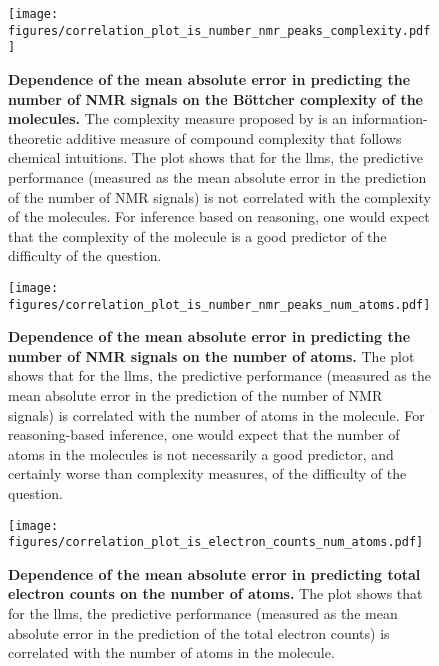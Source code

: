 \begin{figure}
    \centering 
    \texttt{[image: figures/correlation\_plot\_is\_number\_nmr\_peaks\_complexity.pdf]}
    \caption{\textbf{Dependence of the mean absolute error in predicting the number of NMR signals on the Böttcher complexity of the molecules.} The complexity measure proposed by \textcite{B_ttcher_2016} is an information-theoretic additive measure of compound complexity that follows chemical intuitions.
    The plot shows that for the \glspl{llm}, the predictive performance (measured as the mean absolute error in the prediction of the number of NMR signals) is not correlated with the complexity of the molecules. For inference based on reasoning, one would expect that the complexity of the molecule is a good predictor of the difficulty of the question.}
    \label{fig:correlation_plot_is_number_nmr_peaks_complexity}
\end{figure}

\begin{figure}
    \centering
    \texttt{[image: figures/correlation\_plot\_is\_number\_nmr\_peaks\_num\_atoms.pdf]}
    \caption{\textbf{Dependence of the mean absolute error in predicting the number of NMR signals on the number of atoms.} The plot shows that for the \glspl{llm}, the predictive performance (measured as the mean absolute error in the prediction of the number of NMR signals) is correlated with the number of atoms in the molecule. 
    For reasoning-based inference, one would expect that the number of atoms in the molecules is not necessarily a good predictor, and certainly worse than complexity measures, of the difficulty of the question.}
    \label{fig:correlation_plot_is_number_nmr_peaks_num_atoms}
\end{figure}


\begin{figure}
    \centering
    \texttt{[image: figures/correlation\_plot\_is\_electron\_counts\_num\_atoms.pdf]}
    \caption{\textbf{Dependence of the mean absolute error in predicting total electron counts on the number of atoms.} The plot shows that for the \glspl{llm}, the predictive performance (measured as the mean absolute error in the prediction of the total electron counts) is correlated with the number of atoms in the molecule.}
    \label{fig:correlation_plot_is_electron_counts_num_atoms}
\end{figure}

